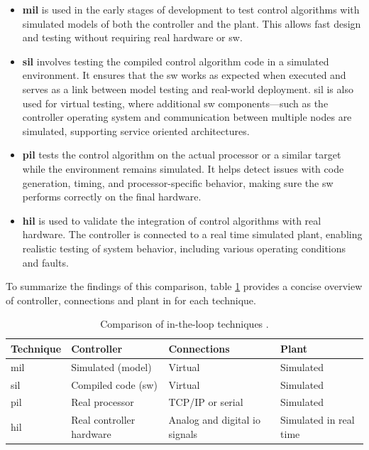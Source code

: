 \begin{itemize}
    \item \textbf{\gls{mil}} is used in the early stages of development to test control algorithms with simulated models of both the controller and the plant. This allows fast design and testing without requiring real hardware or \gls{sw}.
  
    \item \textbf{\gls{sil}} involves testing the compiled control algorithm code in a simulated environment. It ensures that the \gls{sw} works as expected when executed and serves as a link between model testing and real-world deployment. \gls{sil} is also used for virtual testing, where additional \gls{sw} components—such as the controller operating system and communication between multiple nodes are simulated, supporting service oriented architectures.
  
    \item \textbf{\gls{pil}} tests the control algorithm on the actual processor or a similar target while the environment remains simulated. It helps detect issues with code generation, timing, and processor-specific behavior, making sure the \gls{sw} performs correctly on the final hardware.
  
    \item \textbf{\gls{hil}} is used to validate the integration of control algorithms with real hardware. The controller is connected to a real time simulated plant, enabling realistic testing of system behavior, including various operating conditions and faults.
  \end{itemize}

  To summarize the findings of this comparison, table \ref{loop_comparison} provides a concise overview of controller, connections and plant in for each technique.

  \begin{table}[h!]
    \centering
    \caption{Comparison of in-the-loop techniques \cite{HiL_Testing}.}
    \label{loop_comparison}
    \begin{tabularx}{\textwidth}{|l|X|X|X|}
    \hline
    \textbf{Technique} & \textbf{Controller} & \textbf{Connections} & \textbf{Plant} \\
    \hline
    \gls{mil} & Simulated (model) & Virtual & Simulated \\
    \hline
    \gls{sil} & Compiled code (\gls{sw}) & Virtual & Simulated \\
    \hline
    \gls{pil} & Real processor & TCP/IP or serial & Simulated \\
    \hline
    \gls{hil} & Real controller hardware & Analog and digital \gls{io} signals & Simulated in real time \\
    \hline
    \end{tabularx}
    \end{table}


